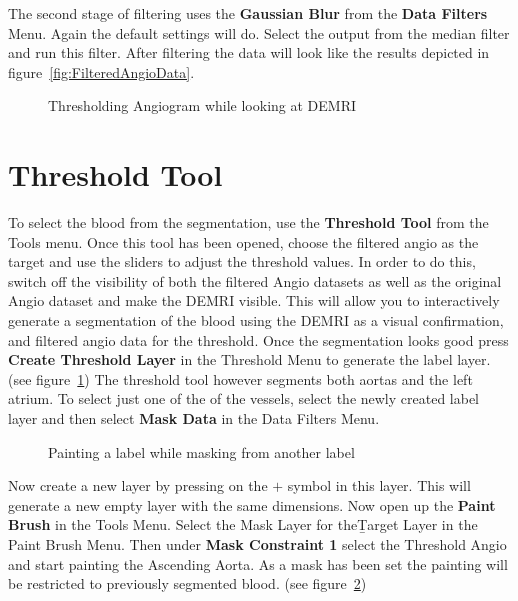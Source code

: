 \documentclass[fleqn,11pt,openany]{book}
\begin{document}
The second stage of filtering uses the {\bf Gaussian Blur} from the {\bf Data Filters} Menu. Again the default settings will do. Select the output from the median filter and run this filter. After filtering the data will look like the results depicted in figure~\ref{fig:FilteredAngioData}.

\begin{figure}
\caption{Thresholding Angiogram while looking at DEMRI}\label{fig:ThresholdAngio}
\end{figure}

\section{Threshold Tool}

To select the blood from the segmentation, use the {\bf Threshold Tool} from the Tools menu. Once this tool has been opened, choose the filtered angio as the target and use the sliders to adjust the threshold values. In order to do this, switch off the visibility of both the filtered Angio datasets as well as the original Angio dataset and make the DEMRI visible. This will allow you to  interactively generate a segmentation of the blood using the DEMRI as a visual confirmation, and filtered angio data for the threshold.  Once the segmentation looks good press {\bf Create Threshold Layer} in the Threshold Menu to generate the label layer. (see figure~\ref{fig:ThresholdAngio}) The threshold tool however segments both aortas and the left atrium. To select just one of the of the vessels, select the newly created label layer and then select {\bf Mask Data} in the Data Filters Menu.

\begin{figure}
\caption{Painting a label while masking from another label}\label{fig:MaskedPainting}
\end{figure}

Now create a new layer by pressing on the $+$ symbol in this layer. This will generate a new empty layer with the same dimensions. Now open up the {\bf Paint Brush} in the Tools Menu. Select the Mask Layer for the{\b Target Layer} in the Paint Brush Menu. Then under {\bf Mask Constraint 1} select the Threshold Angio and start painting the Ascending Aorta. As a mask has been set the painting will be restricted to previously segmented blood. (see figure~\ref{fig:MaskedPainting})
\end{document}
